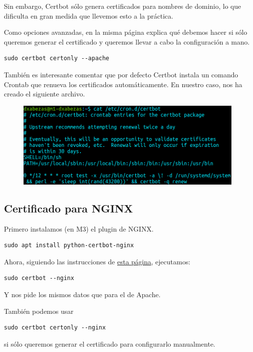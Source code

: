 \documentclass{article}
\begin{document}
Sin embargo, Certbot sólo genera certificados para nombres de dominio, lo que dificulta en gran medida que llevemos esto a la práctica.

Como opciones avanzadas, en la misma página explica qué debemos hacer si sólo queremos generar el certificado y queremos llevar a
cabo la configuración a mano.
\begin{Verbatim}
sudo certbot certonly --apache 
\end{Verbatim}
También es interesante comentar que por defecto Certbot instala un comando Crontab que renueva los certificados automáticamente.
En nuestro caso, nos ha creado el siguiente archivo.

\begin{figure}[H]
	\centering
	\includegraphics[width=140mm]{imgs/renew-crontab}
	\label{fig:renew-crontab}
\end{figure}

\subsection{Certificado para NGINX}

Primero instalamos (en M3) el plugin de NGINX.

\begin{Verbatim}
sudo apt install python-certbot-nginx
\end{Verbatim}

Ahora, siguiendo las instrucciones de \href{https://certbot.eff.org/lets-encrypt/ubuntubionic-nginx}{esta página}, ejecutamos:
\begin{Verbatim}
sudo certbot --nginx
\end{Verbatim}
Y nos pide los mismos datos que para el de Apache.

También podemos usar 
\begin{Verbatim}
sudo certbot certonly --nginx 
\end{Verbatim}
si sólo queremos generar el certificado para configurarlo manualmente.
\end{document}

